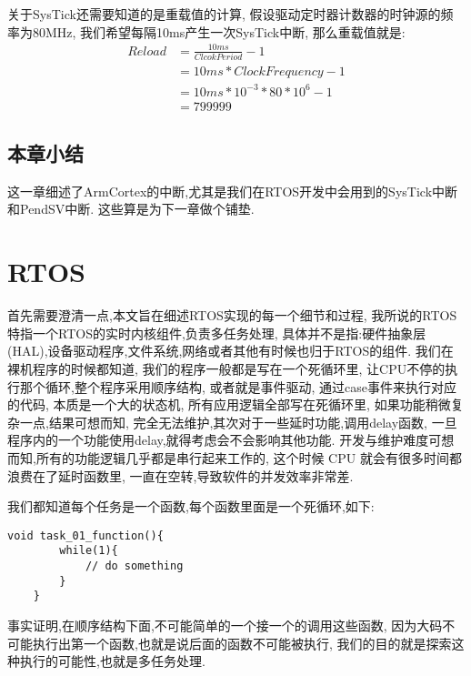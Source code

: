 关于SysTick还需要知道的是重载值的计算,
假设驱动定时器计数器的时钟源的频率为80MHz,
我们希望每隔10ms产生一次SysTick中断,
那么重载值就是:
\begin{align*}
    Reload &= \frac{10ms}{Clcok Period}-1 \\
             &= 10ms * ClockFrequency -1 \\
             &=10ms * 10^{-3} * 80 * 10^{6} -1 \\
             &=799999
\end{align*}

\subsection{本章小结}
这一章细述了ArmCortex的中断,尤其是我们在RTOS开发中会用到的SysTick中断和PendSV中断.
这些算是为下一章做个铺垫.
\section{RTOS}
首先需要澄清一点,本文旨在细述RTOS实现的每一个细节和过程,
我所说的RTOS特指一个RTOS的实时内核组件,负责多任务处理,
具体并不是指:硬件抽象层(HAL),设备驱动程序,文件系统,网络或者其他有时候也归于RTOS的组件.
我们在裸机程序的时候都知道,
我们的程序一般都是写在一个死循环里,
让CPU不停的执行那个循环,整个程序采用顺序结构,
或者就是事件驱动,
通过case事件来执行对应的代码,
本质是一个大的状态机,
所有应用逻辑全部写在死循环里,
如果功能稍微复杂一点,结果可想而知,
完全无法维护,其次对于一些延时功能,调用delay函数,
一旦程序内的一个功能使用delay,就得考虑会不会影响其他功能.
开发与维护难度可想而知,所有的功能逻辑几乎都是串行起来工作的,
这个时候 CPU 就会有很多时间都浪费在了延时函数里,
一直在空转,导致软件的并发效率非常差.

我们都知道每个任务是一个函数,每个函数里面是一个死循环,如下:
\begin{lstlisting}[language={[ANSI]C},keywordstyle=\color{blue!70},commentstyle=\color{red!50!green!50!blue!50},frame=shadowbox, rulesepcolor=\color{red!20!green!20!blue!20}]
    void task_01_function(){
        while(1){
            // do something
        }
    }
\end{lstlisting}
事实证明,在顺序结构下面,不可能简单的一个接一个的调用这些函数,
因为大码不可能执行出第一个函数,也就是说后面的函数不可能被执行,
我们的目的就是探索这种执行的可能性,也就是多任务处理.

